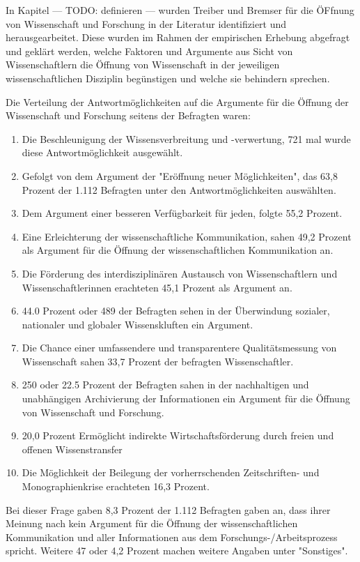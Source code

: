 In Kapitel --- TODO: definieren --- wurden Treiber und Bremser für die ÖFfnung von Wissenschaft und Forschung in der Literatur identifiziert und herausgearbeitet. Diese wurden im Rahmen der empirischen Erhebung abgefragt und geklärt werden, welche Faktoren und Argumente aus Sicht von Wissenschaftlern die Öffnung von Wissenschaft in der jeweiligen wissenschaftlichen Disziplin begünstigen und welche sie behindern sprechen.

Die Verteilung der Antwortmöglichkeiten auf die Argumente für die Öffnung der Wissenschaft und Forschung seitens der Befragten waren:
\begin{enumerate}
\item Die Beschleunigung der Wissensverbreitung und -verwertung, 721 mal wurde diese Antwortmöglichkeit ausgewählt.
\item Gefolgt von dem Argument der "Eröffnung neuer Möglichkeiten", das 63,8 Prozent der 1.112 Befragten unter den Antwortmöglichkeiten auswählten.
\item Dem Argument einer besseren Verfügbarkeit für jeden, folgte 55,2 Prozent.
\item Eine Erleichterung der wissenschaftliche Kommunikation, sahen 49,2 Prozent als Argument für die Öffnung der wissenschaftlichen Kommunikation an.
\item Die Förderung des interdisziplinären Austausch von Wissenschaftlern und Wissenschaftlerinnen erachteten 45,1 Prozent als Argument an.
\item 44.0 Prozent oder 489 der Befragten sehen in der Überwindung sozialer, nationaler und globaler Wissenskluften ein Argument.
\item Die Chance einer umfassendere und transparentere Qualitätsmessung von Wissenschaft sahen 33,7 Prozent der befragten Wissenschaftler.
\item 250 oder 22.5 Prozent der Befragten sahen in der nachhaltigen und unabhängigen Archivierung der Informationen ein Argument für die Öffnung von Wissenschaft und Forschung.
\item 20,0 Prozent Ermöglicht indirekte Wirtschaftsförderung durch freien und offenen Wissenstransfer
\item Die Möglichkeit der Beilegung der vorherrschenden Zeitschriften- und Monographienkrise erachteten 16,3 Prozent.
\end{enumerate}

Bei dieser Frage gaben 8,3 Prozent der 1.112 Befragten gaben an, dass ihrer Meinung nach kein Argument für die Öffnung der wissenschaftlichen Kommunikation und aller Informationen aus dem Forschungs-/Arbeitsprozess spricht. Weitere 47 oder 4,2 Prozent machen weitere Angaben unter "Sonstiges".

